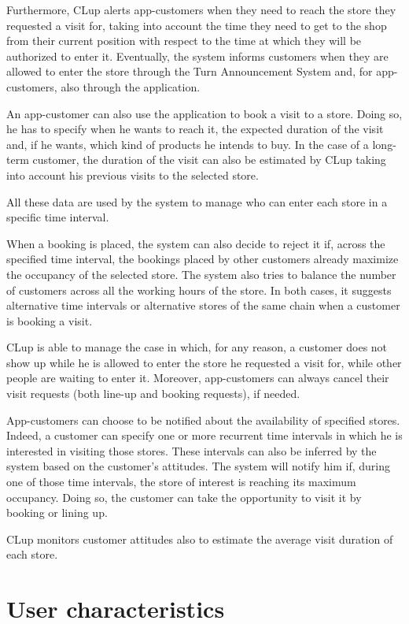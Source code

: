 \documentclass[a4paper,oneside,11pt]{book}   %
\begin{document}
    Furthermore, CLup alerts app-customers when they need to reach the store they requested a visit for, taking into account the time they need to get to the shop from their current position with respect to the time at which they will be authorized to enter it. Eventually, the system informs customers when they are allowed to enter the store through the Turn Announcement System and, for app-customers, also through the application. \par
    An app-customer can also use the application to book a visit to a store. Doing so, he has to specify when he wants to reach it, the expected duration of the visit and, if he wants, which kind of products he intends to buy. In the case of a long-term customer, the duration of the visit can also be estimated by CLup taking into account his previous visits to the selected store. \par
    All these data are used by the system to manage who can enter each store in a specific time interval. \par
    When a booking is placed, the system can also decide to reject it if, across the specified time interval, the bookings placed by other customers already maximize the occupancy of the selected store. The system also tries to balance the number of customers across all the working hours of the store. In both cases, it suggests alternative time intervals or alternative stores of the same chain when a customer is booking a visit. \par
    CLup is able to manage the case in which, for any reason, a customer does not show up while he is allowed to enter the store he requested a visit for, while other people are waiting to enter it. Moreover, app-customers can always cancel their visit requests (both line-up and booking requests), if needed. \par
    App-customers can choose to be notified about the availability of specified stores. Indeed, a customer can specify one or more recurrent time intervals in which he is interested in visiting those stores. These intervals can also be inferred by the system based on the customer’s attitudes. The system will notify him if, during one of those time intervals, the store of interest is reaching its maximum occupancy. Doing so, the customer can take the opportunity to visit it by booking or lining up. \par
    CLup monitors customer attitudes also to estimate the average visit duration of each store.


    \section{User characteristics}
\end{document}
